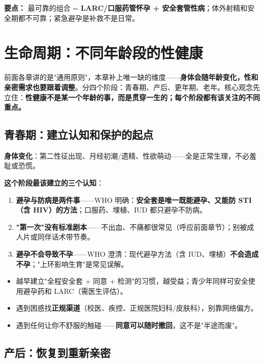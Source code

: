 \documentclass[12pt,UTF8,openany]{ctexbook}
\begin{document}
\vspace{1em}
\noindent\textbf{要点：} 最可靠的组合 = \textbf{LARC/口服药管怀孕 + 安全套管性病}；体外射精和安全期都不可靠；紧急避孕是补救不是日常。

\chapter{生命周期：不同年龄段的性健康}

前面各章讲的是"通用原则"，本章补上唯一缺的维度——\textbf{身体会随年龄变化，性和亲密需求也要跟着调整}。分四个阶段：青春期、产后、更年期、老年。核心观念先立住：\textbf{性健康不是某一个年龄的事，而是贯穿一生的；每个阶段都有该关注的不同重点。}

\section{青春期：建立认知和保护的起点}

\textbf{身体变化}：第二性征出现、月经初潮/遗精、性欲萌动——全是正常生理，不必羞耻或恐慌。

\textbf{这个阶段最该建立的三个认知}：

\begin{enumerate}[leftmargin=2em,itemsep=0.3em]
  \item \textbf{避孕与防病是两件事}——WHO 明确：\textbf{安全套是唯一既能避孕、又能防 STI（含 HIV）的方法}；口服药、埋植、IUD 都只避孕不防病。
  \item \textbf{"第一次"没有标准剧本}——不出血、不痛都很常见（呼应前面章节）；别被成人片或同伴话术带节奏。
  \item \textbf{避孕不会导致不孕}——WHO 澄清：现代避孕方法（含 IUD、埋植）\textbf{不会造成不孕}；"上环影响生育"是常见误解。
\end{enumerate}

\begin{itemize}[leftmargin=2em,itemsep=0.3em]
  \item 越早建立"全程安全套 + 同意 + 检测"的习惯，越受益；青少年同样可安全使用避孕药和 LARC（需医生评估）。
  \item 遇到困惑找\textbf{正规渠道}（校医、疾控、正规医院妇科/皮肤科），别靠网络偏方。
  \item 遇到任何让你不舒服的触碰——\textbf{同意可以随时撤回}，这不是"半途而废"。
\end{itemize}

\section{产后：恢复到重新亲密}
\end{document}
